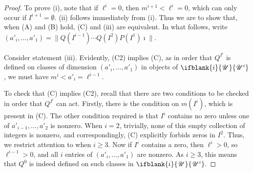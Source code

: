 \documentclass[10pt]{article}
\newcommand{\nontop}[1]{\ifblank{#1}{\scrU}{\scrU^{#1}}}
\renewcommand{\Q}{Q}
\newcommand{\SqShift}{\Sq_{+}}
\newcommand{\Sq}{\mathrm{Sq}}
\newcommand{\minDim}{m}
\begin{document}
\begin{SequenceOfSequencesIntro}
\begin{proof}
To prove (i), note that if $\ell^i=0$, then $\minDim^{i+1}<\ell^i=0$, which can only occur if $I^{i+1}=\emptyset$. (ii) follows immediately from (i). Thus we are to show that, when \textup{(A)} and \textup{(B)} hold, \textup{(C)} and (iii) are equivalent. In what follows, write $(a'_i,\ldots,a'_1)=\|\Q(I^{i-1})\cdots \Q(I^2)P(I^1)\imath\|$.

Consider statement (iii). Evidently, \textup{(C2)} implies \textup{(C)}, as in  order that $\Q^{I^i}$ is defined on classes of dimension $(a'_i,\ldots,a'_1)$ in objects of $\nontop{i}$, we must have $\minDim^i<a'_i=\ell^{i-1}$.

To check that \textup{(C)} implies \textup{(C2)}, recall that there are two conditions to be checked in order that $\Q^{I^i}$ can act. Firstly, there is the condition on $\minDim(I^i)$, which is present in \textup{(C)}. The other condition required is that $I^i$ contains no zero unless one of $a'_{i-1},\ldots,a'_{2}$ is nonzero.
When $i=2$, trivially, none of this empty collection of integers is nonzero, and correspondingly, \textup{(C)} explicitly forbids zeros in $I^2$. Thus, we restrict attention to when $i\geq3$. %
Now if $I^i$ contains a zero, then $\ell^i>0$, so $\ell^{i-1}>0$, and all $i$ entries of $(a'_i,\ldots,a'_1)$ are nonzero. As $i\geq3$, this means that $\Q^0$ is indeed defined on such classes in $\nontop{i}$.
%
\end{proof}


\end{SequenceOfSequencesIntro}
\end{document}
